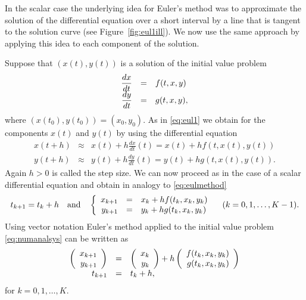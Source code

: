 \documentclass{ximera}
\begin{document}
In the scalar case the underlying idea for 
Euler's method was 
to approximate the solution of the differential equation over 
a short interval by a line that is tangent to the solution curve
(see Figure~\ref{fig:eul1ill}).  We now use the same approach 
by applying this idea to each component of the solution.

Suppose that $(x(t),y(t))$ is a solution of the initial value problem
\arraystart
\begin{equation}
\label{eq:numanalsys}
\begin{array}{rcl}
\displaystyle \frac{dx}{dt} & = & f(t,x,y)\\
\displaystyle \frac{dy}{dt} & = & g(t,x,y),
\end{array}
\end{equation}
\arrayfinish
where $(x(t_0),y(t_0))= (x_0,y_0)$.  As in \eqref{eq:eul1}
we obtain for the components $x(t)$ and $y(t)$
by using the differential equation 
\begin{eqnarray*}
x(t+h) & \approx & x(t) + h \frac{dx}{dt}(t) = x(t) + h f(t,x(t),y(t))\\
y(t+h) & \approx & y(t) + h \frac{dy}{dt}(t) = y(t) + h g(t,x(t),y(t)).
\end{eqnarray*}
Again $h>0$ is called the step size.
We can now proceed as in the case of a scalar differential equation 
and obtain in analogy to \eqref{eq:eulmethod} 
\begin{eqnarray*}
t_{k+1} = t_k+h \quad\mbox{and}\quad 
\left\{\begin{array}{rcl}
x_{k+1} &=& x_k + h f(t_k,x_k,y_k)\\
y_{k+1} &=& y_k + h g(t_k,x_k,y_k)
\end{array}\right.
\quad (k=0,1,\ldots,K-1).
\end{eqnarray*}
Using vector notation Euler's method applied to the initial value problem
\eqref{eq:numanalsys} can be written as
\arraystart
\begin{equation}
\begin{array}{rcl}
\left(\begin{array}{r} x_{k+1} \\ y_{k+1}\end{array}\right) & = & 
\left(\begin{array}{r} x_k \\ y_k\end{array}\right) + h \left(\begin{array}{r} f(t_k,x_k,y_k) \\ g(t_k,x_k,y_k)\end{array}\right)\\
t_{k+1} & = & t_k + h,
\end{array}
\end{equation}
\arrayfinish
for $k=0,1,\ldots,K$.
\end{document}
